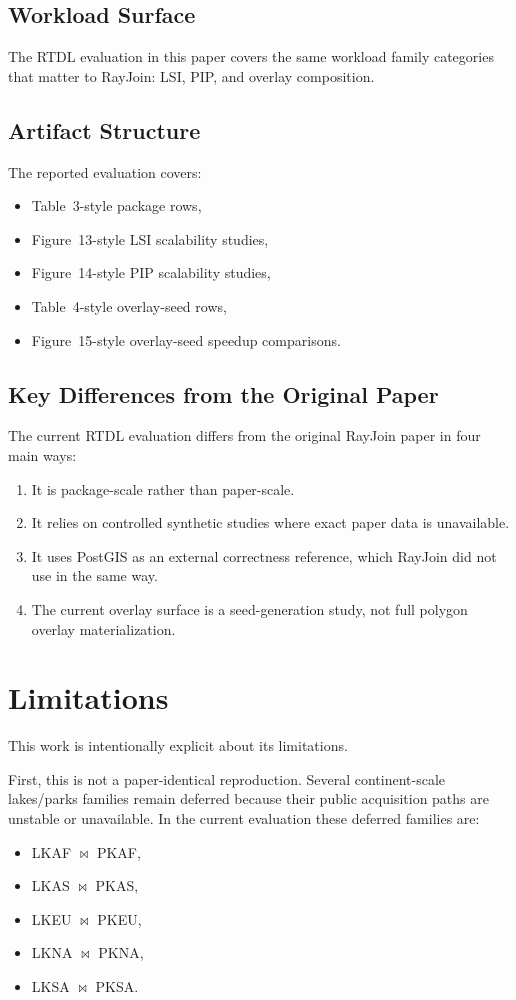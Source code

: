 \documentclass[conference]{IEEEtran}
\begin{document}
\subsection{Workload Surface}

The RTDL evaluation in this paper covers the same workload family categories
that matter to RayJoin: LSI, PIP, and overlay composition.

\subsection{Artifact Structure}

The reported evaluation covers:
\begin{itemize}
\item Table~3-style package rows,
\item Figure~13-style LSI scalability studies,
\item Figure~14-style PIP scalability studies,
\item Table~4-style overlay-seed rows,
\item Figure~15-style overlay-seed speedup comparisons.
\end{itemize}

\subsection{Key Differences from the Original Paper}

The current RTDL evaluation differs from the original RayJoin paper in four
main ways:
\begin{enumerate}
\item It is package-scale rather than paper-scale.
\item It relies on controlled synthetic studies where exact paper data is unavailable.
\item It uses PostGIS as an external correctness reference, which RayJoin did
not use in the same way.
\item The current overlay surface is a seed-generation study, not full
polygon overlay materialization.
\end{enumerate}

\section{Limitations}

This work is intentionally explicit about its limitations.

First, this is not a paper-identical reproduction. Several continent-scale
lakes/parks families remain deferred because their public acquisition paths are
unstable or unavailable. In the current evaluation these deferred families
are:
\begin{itemize}
\item LKAF $\bowtie$ PKAF,
\item LKAS $\bowtie$ PKAS,
\item LKEU $\bowtie$ PKEU,
\item LKNA $\bowtie$ PKNA,
\item LKSA $\bowtie$ PKSA.
\end{itemize}
\end{document}
